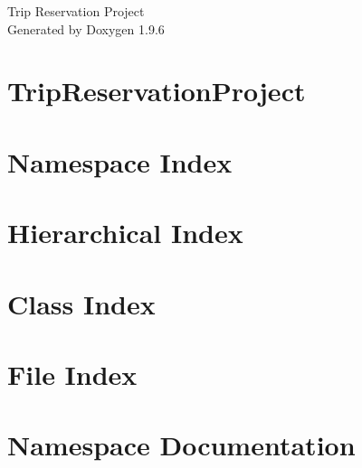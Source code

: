 \documentclass[twoside]{book}
\newcommand{\+}{\discretionary{\mbox{\scriptsize$\hookleftarrow$}}{}{}}
\newcommand{\clearemptydoublepage}{%
    \newpage{\pagestyle{empty}\cleardoublepage}%
  }
\begin{document}
  \raggedbottom
    \hypersetup{pageanchor=false,
                bookmarksnumbered=true,
                pdfencoding=unicode
               }
  \begin{titlepage}
  \vspace*{7cm}
  \begin{center}%
  {\Large Trip Reservation Project}\\
  \vspace*{1cm}
  {\large Generated by Doxygen 1.9.6}\\
  \end{center}
  \end{titlepage}
  \clearemptydoublepage
  \tableofcontents
  \clearemptydoublepage
  \hypersetup{pageanchor=true}
\chapter{Trip\+Reservation\+Project}
\label{md__r_e_a_d_m_e}

\chapter{Namespace Index}

\chapter{Hierarchical Index}

\chapter{Class Index}

\chapter{File Index}

\chapter{Namespace Documentation}




\end{document}
